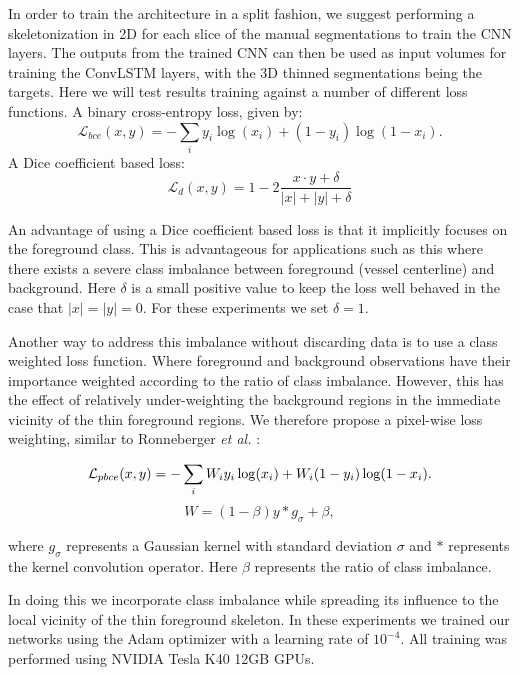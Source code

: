 \documentclass[journal,transmag]{IEEEtran}
\begin{document}
In order to train the architecture in a split fashion, we suggest performing a skeletonization in 2D for each slice of the manual segmentations to train the CNN layers. The outputs from the trained CNN can then be used as input volumes for training the ConvLSTM layers, with the 3D thinned segmentations being the targets. Here we will test results training against a number of different loss functions.
A binary cross-entropy loss, given by:
\begin{equation}
\mathcal{L}_{bce}(x,y) = -\sum_i{y_i \log(x_i) + (1-y_i) \log(1-x_i)}.
\label{eq:bce}
\end{equation}
A Dice coefficient based loss:
\begin{equation}
\mathcal{L}_{d}(x,y) = 1 - 2\frac{x \cdot y + \delta}{|x| + |y| + \delta}
\label{eq:dice}
\end{equation}

An advantage of using a Dice coefficient based loss is that it implicitly focuses on the foreground class. This is advantageous for applications such as this where there exists a severe class imbalance between foreground (vessel centerline) and background. Here $\delta$ is a small positive value to keep the loss well behaved in the case that $|x| = |y| = 0$. For these experiments we set $\delta = 1$.

Another way to address this imbalance without discarding data is to use a class weighted loss function. Where foreground and background observations have their importance weighted according to the ratio of class imbalance. However, this has the effect of relatively under-weighting the background regions in the immediate vicinity of the thin foreground regions. We therefore propose a pixel-wise loss weighting, similar to Ronneberger \emph{et al.} \cite{Ronneberger2015}:

\begin{equation}
\mathcal{L}_{pbce}(x,y) = -\sum_i{W_i y_i \log(x_i) + W_i (1-y_i) \log(1-x_i)}. \\
\label{eq:wbce}
\end{equation}
\begin{equation}
W = (1-\beta) y \ast g_\sigma + \beta,
\end{equation}

where $g_\sigma$ represents a Gaussian kernel with standard deviation $\sigma$ and $\ast$ represents the kernel convolution operator. Here $\beta$ represents the ratio of class imbalance.

In doing this we incorporate class imbalance while spreading its influence to the local vicinity of the thin foreground skeleton. In these experiments we trained our networks using the Adam optimizer \cite{Kingma2014} with a learning rate of $10^{-4}$. All training was performed using NVIDIA Tesla K40 12GB GPUs.
\end{document}
